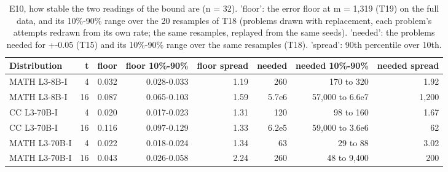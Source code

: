 \begin{table}[t]
\centering
\small
\begin{tabular}{lrrrrrrr}
\toprule
Distribution & t & floor & floor 10\%-90\% & floor spread & needed & needed 10\%-90\% & needed spread \\
\midrule
MATH L3-8B-I & 4 & 0.032 & 0.028-0.033 & 1.19 & 260 & 170 to 320 & 1.92 \\
MATH L3-8B-I & 16 & 0.087 & 0.065-0.103 & 1.59 & 5.7e6 & 57,000 to 6.6e7 & 1,200 \\
CC L3-70B-I & 4 & 0.020 & 0.017-0.023 & 1.31 & 120 & 98 to 160 & 1.67 \\
CC L3-70B-I & 16 & 0.116 & 0.097-0.129 & 1.33 & 6.2e5 & 59,000 to 3.6e6 & 62 \\
MATH L3-70B-I & 4 & 0.022 & 0.018-0.024 & 1.34 & 63 & 29 to 88 & 3.02 \\
MATH L3-70B-I & 16 & 0.043 & 0.026-0.058 & 2.24 & 260 & 48 to 9,400 & 200 \\
\bottomrule
\end{tabular}
\caption{E10, how stable the two readings of the bound are (n = 32). 'floor': the error floor at m = 1,319 (T19) on the full data, and its 10\%-90\% range over the 20 resamples of T18 (problems drawn with replacement, each problem's attempts redrawn from its own rate; the same resamples, replayed from the same seeds). 'needed': the problems needed for +-0.05 (T15) and its 10\%-90\% range over the same resamples (T18). 'spread': 90th percentile over 10th.}
\label{tab:T20_floor_vs_problems_needed_stability}
\end{table}
